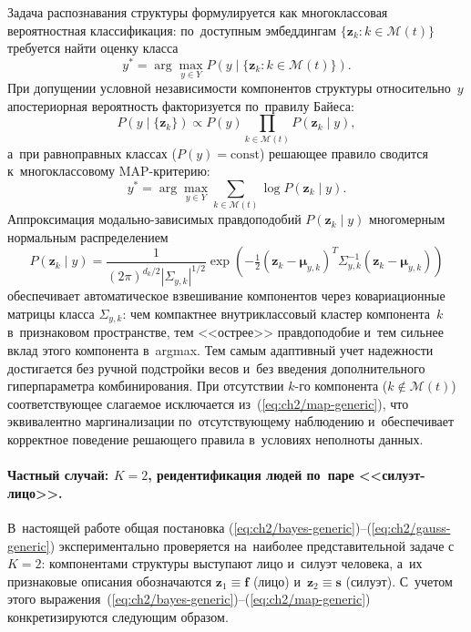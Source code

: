 Задача распознавания структуры формулируется как многоклассовая
вероятностная классификация: по~доступным эмбеддингам
$\{\mathbf{z}_k\colon k\in\mathcal{M}(t)\}$ требуется найти
оценку класса
\begin{equation}\label{eq:ch2/bayes-generic}
    y^{*}=\arg\max_{y\in Y}P\!\left(y\mid\{\mathbf{z}_k\colon k\in\mathcal{M}(t)\}\right).
\end{equation}
При допущении условной независимости компонентов структуры
относительно~$y$ апостериорная вероятность факторизуется
по~правилу Байеса:
\begin{equation}\label{eq:ch2/bayes-factor-generic}
    P\!\left(y\mid\{\mathbf{z}_k\}\right)\propto P(y)\prod_{k\in\mathcal{M}(t)}P(\mathbf{z}_k\mid y),
\end{equation}
а~при равноправных классах ($P(y)=\mathrm{const}$) решающее
правило сводится к~многоклассовому MAP-критерию:
\begin{equation}\label{eq:ch2/map-generic}
    y^{*}=\arg\max_{y\in Y}\sum_{k\in\mathcal{M}(t)}\log P(\mathbf{z}_k\mid y).
\end{equation}
Аппроксимация модально-зависимых правдоподобий
$P(\mathbf{z}_k\mid y)$ многомерным нормальным распределением
\begin{equation}\label{eq:ch2/gauss-generic}
    P(\mathbf{z}_k\mid y)=
    \frac{1}{(2\pi)^{d_k/2}|\Sigma_{y,k}|^{1/2}}
    \exp\!\left(-\tfrac{1}{2}(\mathbf{z}_k-\boldsymbol{\mu}_{y,k})^{T}\Sigma_{y,k}^{-1}(\mathbf{z}_k-\boldsymbol{\mu}_{y,k})\right)
\end{equation}
обеспечивает автоматическое взвешивание компонентов через
ковариационные матрицы класса $\Sigma_{y,k}$: чем компактнее
внутриклассовый кластер компонента~$k$ в~признаковом пространстве,
тем <<острее>> правдоподобие и~тем сильнее вклад этого компонента
в~argmax. Тем самым адаптивный учет надежности достигается без
ручной подстройки весов и~без введения дополнительного гиперпараметра
комбинирования. При отсутствии $k$-го компонента
($k\notin\mathcal{M}(t)$) соответствующее слагаемое исключается
из~(\ref{eq:ch2/map-generic}), что эквивалентно маргинализации
по~отсутствующему наблюдению и~обеспечивает корректное поведение
решающего правила в~условиях неполноты данных.

\paragraph{Частный случай: $K=2$, реидентификация людей по~паре <<силуэт-лицо>>.}
В~настоящей работе общая постановка
(\ref{eq:ch2/bayes-generic})--(\ref{eq:ch2/gauss-generic})
экспериментально проверяется на~наиболее представительной задаче
с~$K=2$: компонентами структуры выступают лицо и~силуэт человека,
а~их признаковые описания обозначаются $\mathbf{z}_1\equiv\mathbf{f}$
(лицо) и~$\mathbf{z}_2\equiv\mathbf{s}$ (силуэт). С~учетом этого
выражения~(\ref{eq:ch2/bayes-generic})--(\ref{eq:ch2/map-generic})
конкретизируются следующим образом.

